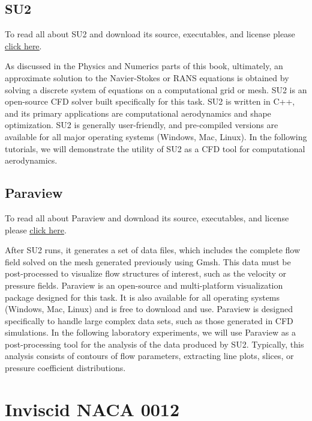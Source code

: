 \section{SU2}
\begin{su2note}
	To read all about SU2 and download its source, executables, and license please \href{https://su2code.github.io/}{\underline{click here}}.
\end{su2note}
As discussed in the Physics and Numerics parts of this book, ultimately, an approximate solution to the Navier-Stokes or RANS equations is obtained by solving a discrete system of equations on a computational grid or mesh. SU2 is an open-source CFD solver built specifically for this task. SU2 is written in C++, and its primary applications are computational aerodynamics and shape optimization. SU2 is generally user-friendly, and pre-compiled versions are available for all major operating systems (Windows, Mac, Linux). In the following tutorials, we will demonstrate the utility of SU2 as a CFD tool for computational aerodynamics.

\section{Paraview}
\begin{paraviewnote}
	To read all about Paraview and download its source, executables, and license please \href{https://www.paraview.org/}{\underline{click here}}.
\end{paraviewnote}
After SU2 runs, it generates a set of data files, which includes the complete flow field solved on the mesh generated previously using Gmsh. This data must be post-processed to visualize flow structures of interest, such as the velocity or pressure fields. Paraview is an open-source and multi-platform visualization package designed for this task. It is also available for all operating systems (Windows, Mac, Linux) and is free to download and use. Paraview is designed specifically to handle large complex data sets, such as those generated in CFD simulations. In the following laboratory experiments, we will use Paraview as a post-processing tool for the analysis of the data produced by SU2. Typically, this analysis consists of contours of flow parameters, extracting line plots, slices, or pressure coefficient distributions.

 \chapter{Inviscid NACA 0012}
\label{ch:Inviscid NACA 0012}
